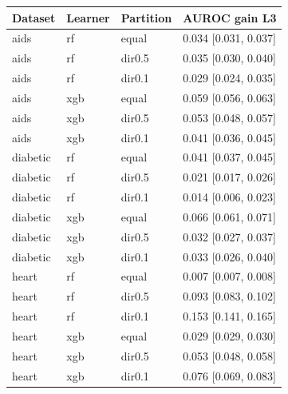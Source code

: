 \begin{tabular}{llll}
\toprule
Dataset & Learner & Partition & AUROC gain L3 \\
\midrule
aids & rf & equal & 0.034 [0.031, 0.037] \\
aids & rf & dir0.5 & 0.035 [0.030, 0.040] \\
aids & rf & dir0.1 & 0.029 [0.024, 0.035] \\
aids & xgb & equal & 0.059 [0.056, 0.063] \\
aids & xgb & dir0.5 & 0.053 [0.048, 0.057] \\
aids & xgb & dir0.1 & 0.041 [0.036, 0.045] \\
\addlinespace
diabetic & rf & equal & 0.041 [0.037, 0.045] \\
diabetic & rf & dir0.5 & 0.021 [0.017, 0.026] \\
diabetic & rf & dir0.1 & 0.014 [0.006, 0.023] \\
diabetic & xgb & equal & 0.066 [0.061, 0.071] \\
diabetic & xgb & dir0.5 & 0.032 [0.027, 0.037] \\
diabetic & xgb & dir0.1 & 0.033 [0.026, 0.040] \\
\addlinespace
heart & rf & equal & 0.007 [0.007, 0.008] \\
heart & rf & dir0.5 & 0.093 [0.083, 0.102] \\
heart & rf & dir0.1 & 0.153 [0.141, 0.165] \\
heart & xgb & equal & 0.029 [0.029, 0.030] \\
heart & xgb & dir0.5 & 0.053 [0.048, 0.058] \\
heart & xgb & dir0.1 & 0.076 [0.069, 0.083] \\
\bottomrule
\end{tabular}
